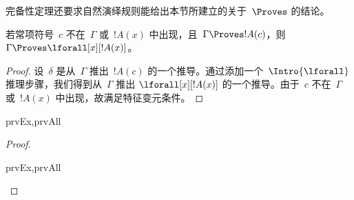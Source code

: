 \documentclass[../../../include/open-logic-section]{subfiles}
\begin{document}


\begin{explain}
完备性定理还要求自然演绎规则能给出本节所建立的关于~$\Proves$ 的结论。
\end{explain}

\begin{thm}
 若常项符号~$c$ 不在~$\Gamma$ 或~$!A(x)$ 中出现，且~$\Gamma \Proves !A(c)$，则 $\Gamma
\Proves \lforall[x][!A(x)]$。
\end{thm}

\begin{proof}
设~$\delta$ 是从~$\Gamma$ 推出~$!A(c)$ 的一个推导。通过添加一个~$\Intro{\lforall}$ 推理步骤，我们得到从~$\Gamma$ 推出 $\lforall[x][!A(x)]$ 的一个推导。由于~$c$ 不在~$\Gamma$ 或~$!A(x)$ 中出现，故满足特征变元条件。
\end{proof}

\begin{prop}
\begin{tagenumerate}{prvEx,prvAll}

\end{tagenumerate}
\end{prop}

\begin{proof}
\begin{tagenumerate}{prvEx,prvAll}

\end{tagenumerate}
\end{proof}
\end{document}
